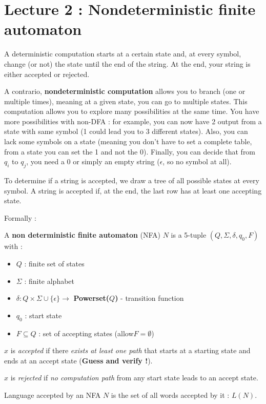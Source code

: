 \documentclass[12pt,a4paper]{article}
\newcommand{\<}{\langle}
\renewcommand{\>}{\rangle}
\begin{document}
\section{Lecture 2 : Nondeterministic finite automaton}
A deterministic computation starts at a certain state and, at every symbol, change (or not) the state until the end of the string. At the end, your string is either accepted or rejected. 

A contrario, \textbf{nondeterministic computation} allows you to branch (one or multiple times), meaning at a given state, you can go to multiple states. This computation allows you to explore many possibilities at the same time. You have more possibilities with non-DFA : for example, you can now have 2 output from a state with same symbol (1 could lead you to 3 different states). Also, you can lack some symbols on a state (meaning you don't have to set a complete table, from a state you can set the 1 and not the 0). Finally, you can decide that from $q_i$ to $q_j$, you need a 0 or simply an empty string ($\epsilon$, so no symbol at all).

To determine if a string is accepted, we draw a tree of all possible states at every symbol. A string is accepted if, at the end, the last row has at least one accepting state.

Formally : 
\begin{boite}
    A \textbf{non deterministic finite automaton} (NFA) $N$ is a 5-tuple $(Q, \Sigma, \delta, q_0, F)$ with :
    \begin{itemize}
        \item     $Q$ : finite set of states
        \item     $\Sigma$ : finite alphabet
        \item     $\delta : Q \times \Sigma \cup \{\epsilon\} \to$ \textbf{Powerset($Q$)} - transition function
        \item     $q_0$ : start state
        \item     $F \subseteq Q$ : set of accepting states (allow$ F = \emptyset$)
    \end{itemize}
    $x$ is \textit{accepted} if there \textit{exists at least one path} that starts at a starting state and ends at an accept state (\textbf{Guess and verify !}).
    
    $x$ is \textit{rejected} if  \textit{no computation path} from any start state leads to an accept state.
\end{boite}
Language accepted by an NFA $N$ is the set of all words accepted by it : $L(N)$.
\end{document}
